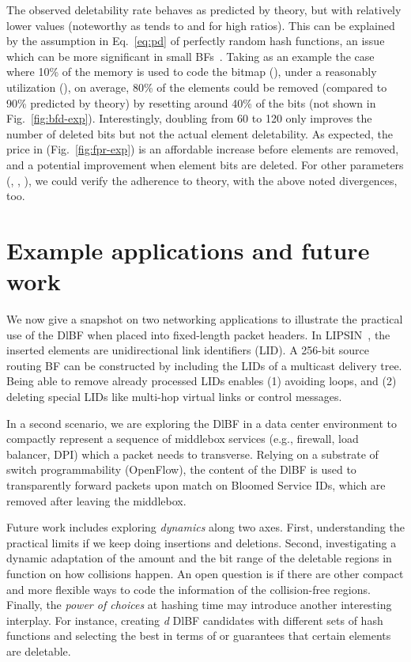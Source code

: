\documentclass[conference]{IEEEtran}
\begin{document}
The observed deletability rate behaves as predicted by theory, but with relatively lower values (noteworthy as  tends to  and for high  ratios). This can be explained by the assumption in Eq.~\ref{eq:pd} of perfectly random hash functions, an issue which can be more significant in small BFs~\cite{bose2008false}. 
Taking as an example the case where 10\% of the memory is used to code the bitmap (), under a reasonably utilization (), on average, 80\% of the elements could be removed (compared to 90\% predicted by theory)  by resetting around 40\% of the bits (not shown in Fig.~\ref{fig:bfd-exp}). Interestingly, doubling  from 60 to 120 only improves the number of deleted bits but not the actual element deletability. 
As expected, the price in   (Fig.~\ref{fig:fpr-exp}) is an affordable increase before elements are removed, and a potential improvement when element bits are deleted. For other parameters (, , ), we could verify the adherence to theory, with the above noted divergences, too. 








\section{Example applications and future work}
\label{sec:applications}

We now give a snapshot on two networking applications to illustrate the practical use of the DlBF when placed
into fixed-length packet headers. 
In LIPSIN~\cite{lipsin}, the inserted elements are unidirectional link identifiers (LID). A 256-bit source routing BF can be constructed by including the LIDs of a multicast delivery tree. Being able to remove already processed LIDs enables (1) avoiding loops, and (2) deleting special LIDs like multi-hop virtual links or control messages. 

In a second scenario, we are exploring the DlBF in a data center environment to compactly represent a sequence of middlebox services (e.g., firewall, load balancer, DPI) which a packet needs to transverse. Relying on a substrate of switch programmability (OpenFlow), the content of the DlBF is used to transparently forward packets upon match on Bloomed Service IDs, which are removed after leaving the middlebox. 

Future work includes exploring \textit{dynamics} along two axes. First, understanding the practical limits if we keep doing insertions and deletions. Second,
investigating a dynamic adaptation of the amount and the bit range of the deletable regions in function on how collisions happen. 
An open question is if there are other compact and more flexible ways to code the information of the collision-free regions.
Finally, the \textit{power of choices} at hashing time may introduce another interesting interplay. For instance, creating \textit{d} DlBF candidates with different sets of hash functions and selecting the best  in terms of  or guarantees that certain elements are deletable. 
\end{document}
